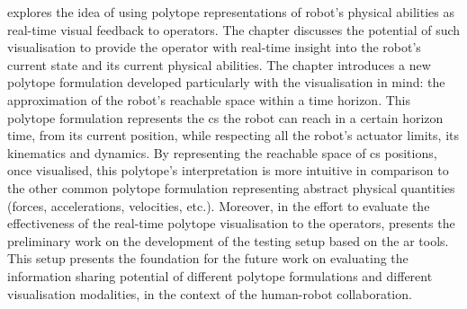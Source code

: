 

 explores the idea of using polytope representations of robot's physical abilities as real-time visual feedback to operators. The chapter discusses the potential of such visualisation to provide the operator with real-time insight into the robot's current state and its current physical abilities. The chapter introduces a new polytope formulation developed particularly with the visualisation in mind: the approximation of the robot's reachable space within a time horizon. This polytope formulation represents the \gls{cs} the robot can reach in a certain horizon time, from its current position, while respecting all the robot's actuator limits, its kinematics and dynamics. 
By representing the reachable space of \gls{cs} positions, once visualised, this polytope's interpretation is more intuitive in comparison to the other common polytope formulation representing abstract physical quantities (forces, accelerations, velocities, etc.). 
Moreover, in the effort to evaluate the effectiveness of the real-time polytope visualisation to the operators, 
 presents the preliminary work on the development of the testing setup based on the \gls{ar} tools. This setup presents the foundation for the future work on evaluating the information sharing potential of different polytope formulations and different visualisation modalities, in the context of the human-robot collaboration. 



